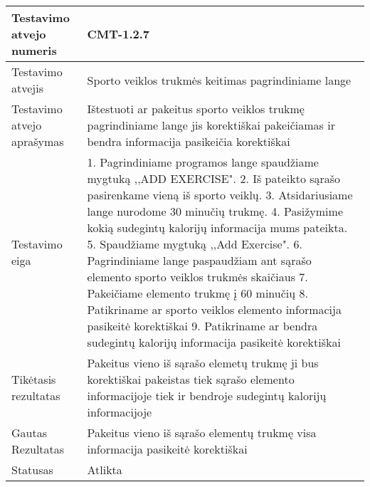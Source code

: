 \documentclass[oneside]{VUMIFPSkursinis}
\begin{document}
\begin{center}
    \begin{tabular}{ |p{5cm}|p{13cm}|}
    \hline
        Testavimo atvejo numeris & CMT-1.2.7  \\ \hline
        Testavimo atvejis & Sporto veiklos trukmės keitimas pagrindiniame lange \\ \hline
        Testavimo atvejo aprašymas & Ištestuoti ar pakeitus sporto veiklos trukmę pagrindiniame lange jis korektiškai pakeičiamas ir bendra informacija pasikeičia korektiškai \\ \hline
        Testavimo eiga &  1. Pagrindiniame programos lange spaudžiame mygtuką ,,ADD EXERCISE". 
				2. Iš pateikto sąrašo pasirenkame vieną iš sporto veiklų. 
				3. Atsidariusiame lange nurodome 30 minučių trukmę.
				4. Pasižymime kokią sudegintų kalorijų informacija mums pateikta. 
				5. Spaudžiame mygtuką ,,Add Exercise".
				6. Pagrindiniame lange paspaudžiam ant sąrašo elemento sporto veiklos trukmės skaičiaus
				7. Pakeičiame elemento trukmę į 60 minučių
				8. Patikriname ar sporto veiklos elemento informacija pasikeitė korektiškai
				9. Patikriname ar bendra sudegintų kalorijų informacija pasikeitė korektiškai\\ \hline
        Tikėtasis rezultatas &  Pakeitus vieno iš sąrašo elemetų trukmę ji bus korektiškai pakeistas tiek sąrašo elemento informacijoje tiek ir bendroje sudegintų kalorijų informacijoje \\ \hline
        Gautas Rezultatas & Pakeitus vieno iš sąrašo elementų trukmę visa informacija pasikeitė korektiškai \\ \hline
        Statusas &  Atlikta\\ \hline
    \hline
    \end{tabular}
\end{center}
\end{document}
